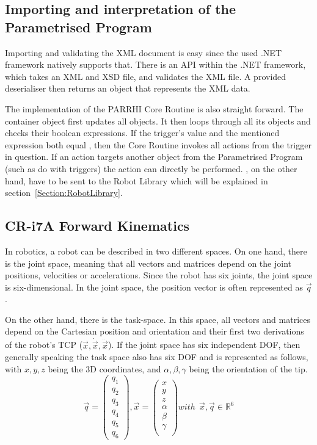\subsection{Importing and interpretation of the Parametrised Program}

Importing and validating the XML document is easy since the used .NET framework natively supports that. There is an API within the .NET framework, which takes an XML and XSD file, and validates the XML file. A provided deserialiser then returns an object that represents the XML data.

The implementation of the PARRHI Core Routine is also straight forward. The container object first updates all  objects. It then loops through all its  objects and checks their boolean expressions. If the trigger's  value and the mentioned expression both equal , then the Core Routine invokes all actions from the trigger in question. If an action targets another object from the Parametrised Program (such as  do with triggers) the action can directly be performed. , on the other hand, have to be sent to the Robot Library which will be explained in section~\ref{Section:RobotLibrary}.

\subsection{CR-i7A Forward Kinematics}\label{Section:ForwardKinematics}
In robotics, a robot can be described in two different spaces. On one hand, there is the joint space, meaning that all vectors and matrices depend on the joint positions, velocities or accelerations. Since the robot has six joints, the joint space is six-dimensional. In the joint space, the position vector is often represented as $ \vec{q} $.

On the other hand, there is the task-space. In this space, all vectors and matrices depend on the Cartesian position and orientation and their first two derivations of the robot's TCP ($ \vec{x}, \dot{\vec{x}}, \ddot{\vec{x}} $). If the joint space has six independent DOF, then generally speaking the task space also has six DOF and is represented as follows, with $x,y,z$ being the 3D coordinates, and $\alpha, \beta, \gamma $ being the orientation of the tip.
\[ \vec{q} = \begin{pmatrix} q_1 \\ q_2 \\ q_3 \\ q_4 \\ q_5 \\ q_6 \end{pmatrix}, \vec{x} = \begin{pmatrix} x \\ y \\ z \\ \alpha \\ \beta \\ \gamma \\ \end{pmatrix} with~~\vec{x},\vec{q} \in \mathbb{R}^6  \]

